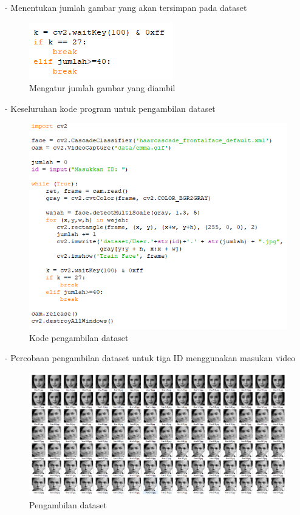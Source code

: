 \begin{enumerate}[1.]
- Menentukan jumlah gambar yang akan tersimpan pada dataset
\begin{figure}[h!]
    \centering
    \includegraphics[width=0.5\linewidth]{images/fr_6.PNG}
    \caption{Mengatur jumlah gambar yang diambil}
\end{figure}
\newpage
- Keseluruhan kode program untuk pengambilan dataset
\begin{figure}[h!]
    \centering
    \includegraphics[width=0.85\linewidth]{images/fr_full.PNG}
    \caption{Kode pengambilan dataset}
\end{figure}

- Percobaan pengambilan dataset untuk tiga ID menggunakan masukan video
\begin{figure}[h!]
    \centering
    \includegraphics[width=1.2\linewidth]{images/dataset.PNG}
    \caption{Pengambilan dataset}
\end{figure}


\end{enumerate}
